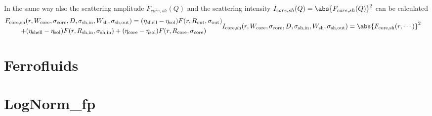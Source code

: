 In the same way also the scattering amplitude $F_{core,sh}(Q)$ and the scattering intensity
$I_{core,sh}(Q)=\abs{F_{core,sh}(Q)}^2$ can be calculated
\begin{subequations}
\begin{multline}
F_\textrm{core,sh}(r,W_\textrm{core},\sigma_\textrm{core},D,\sigma_\textrm{sh,in},W_\textrm{sh},\sigma_\textrm{sh,out}) =
  (\eta_\textrm{shell}-\eta_\textrm{sol}) F(r,R_\textrm{out},\sigma_\textrm{out}) \\
+ (\eta_\textrm{shell}-\eta_\textrm{sol}) F(r,R_\textrm{sh,in},\sigma_\textrm{sh,in})
+ (\eta_\textrm{core} -\eta_\textrm{sol}) F(r,R_\textrm{core},\sigma_\textrm{core})
\end{multline}
\begin{align}
I_\textrm{core,sh}(r,W_\textrm{core},\sigma_\textrm{core},D,\sigma_\textrm{sh,in},W_\textrm{sh},\sigma_\textrm{sh,out}) &=
\abs{F_\textrm{core,sh}(r,\cdots)}^2
\end{align}
\end{subequations}

\clearpage
\section{Ferrofluids} \hspace{1pt}
\label{sec:ferrofluid}

\clearpage
\section{LogNorm\_fp} \hspace{1pt}
\label{sec:sd_lognorm_fp}

